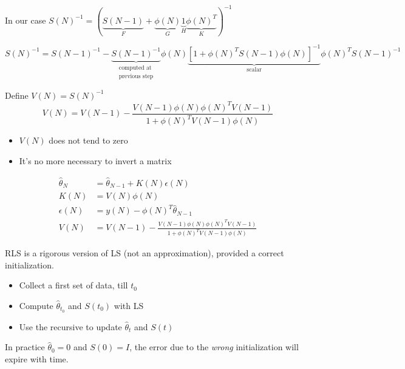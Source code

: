 In our case $S(N)^{-1} = (\underbrace{S(N-1)}_F + \underbrace{\phi(N)}_G \underbrace{1}_H \underbrace{\phi(N)^T}_K )^{-1}$

\[
    S(N)^{-1} = S(N-1)^{-1} - \underbrace{S(N-1)^{-1}}_{\substack{\text{computed at}\\\text{previous step}}}\phi(N)\underbrace{\left[1 + \phi(N)^TS(N-1)\phi(N) \right]^{-1}}_\text{scalar}\phi(N)^TS(N-1)^{-1}
\]

Define $V(N) = S(N)^{-1}$
\[
    V(N) = V(N-1) - \frac{V(N-1)\phi(N)\phi(N)^TV(N-1)}{1+\phi(N)^TV(N-1)\phi(N)}
\]
\begin{itemize}
    \item $V(N)$ does not tend to zero
    \item It's no more necessary to invert a matrix
\end{itemize}

\begin{align*}
    \hat{\theta}_N &= \hat{\theta}_{N-1} + K(N)\epsilon(N) \\
    K(N) &= V(N)\phi(N) \\
    \epsilon(N) &= y(N) - \phi(N)^T\hat{\theta}_{N-1} \\
    V(N) &= V(N-1) - \frac{V(N-1)\phi(N)\phi(N)^TV(N-1)}{1+\phi(N)^TV(N-1)\phi(N)}
\end{align*}

\begin{remark}
    RLS is a rigorous version of LS (not an approximation), provided a correct initialization.

    \begin{figure}[H]
        \centering
    \end{figure}

    \begin{itemize}
        \item Collect a first set of data, till $t_0$
        \item Compute $\hat{\theta}_{t_0}$ and $S(t_0)$ with LS
        \item Use the recursive to update $\hat{\theta}_t$ and $S(t)$
    \end{itemize}

    In practice $\hat{\theta}_0 = 0$ and $S(0) = I$, the error due to the \emph{wrong} initialization will expire with time.
\end{remark}

